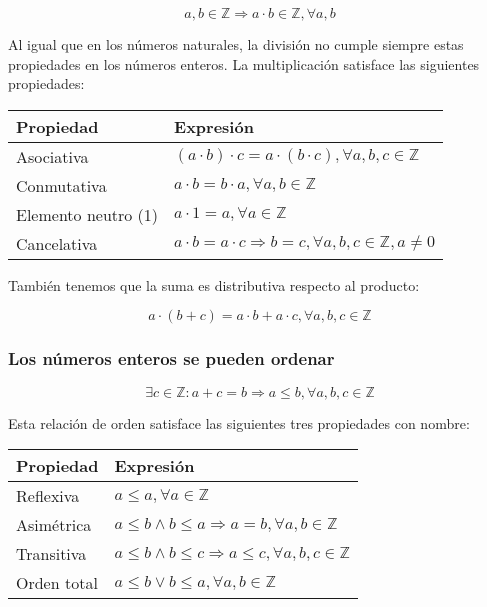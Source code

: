 \[a,b \in\mathbb{Z} \Rightarrow a \cdot b \in\mathbb{Z}, \forall a,b\]

Al igual que en los números naturales, la división no cumple siempre estas propiedades en los números enteros.
La multiplicación satisface las siguientes propiedades:

\begin{center}
\begin{tabular}{l l}
	\textbf{Propiedad}  & \textbf{Expresión}                                                             \\
	\toprule
	Asociativa          & $(a \cdot b) \cdot c = a \cdot (b \cdot c), \forall a,b,c \in\mathbb{Z}$       \\
	Conmutativa         & $a \cdot b = b \cdot a, \forall a,b \in\mathbb{Z}$                             \\
	Elemento neutro (1) & $a \cdot 1 = a, \forall a \in\mathbb{Z}$                                       \\
	Cancelativa         & $a \cdot b = a \cdot c \Rightarrow b=c, \forall a,b,c \in\mathbb{Z}, a \neq 0$ \\
\end{tabular}
\end{center}

También tenemos que la suma es distributiva respecto al producto:

\[a \cdot (b+c) = a \cdot b + a \cdot c, \forall a,b,c \in\mathbb{Z}\]

\subsubsection{Los números enteros se pueden ordenar}

\[\exists c \in\mathbb{Z} : a+c = b \Rightarrow a \leq b, \forall a,b,c \in\mathbb{Z}\]

Esta relación de orden satisface las siguientes tres propiedades con nombre:

\begin{center}
\begin{tabular}{l l}
	\textbf{Propiedad} & \textbf{Expresión}                                                          \\
	\toprule
	Reflexiva          & $a \leq a, \forall a \in\mathbb{Z}$                                         \\
	Asimétrica         & $a \leq b \land b \leq a \Rightarrow a=b, \forall a,b \in\mathbb{Z}$        \\
	Transitiva         & $a \leq b \land b \leq c \Rightarrow a \leq c, \forall a,b,c \in\mathbb{Z}$ \\
	Orden total        & $a \leq b \lor b \leq a, \forall a,b \in\mathbb{Z}$                         \\
\end{tabular}
\end{center}

